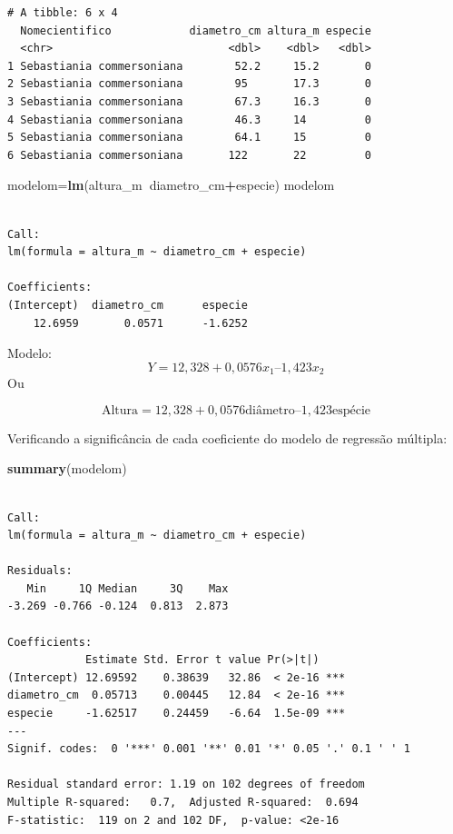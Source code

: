 \documentclass[12pt,brazil,oneside]{book}
\newenvironment{Shaded}{\begin{snugshade}}{\end{snugshade}}
\newcommand{\KeywordTok}[1]{\textcolor[rgb]{0.13,0.29,0.53}{\textbf{#1}}}
\newcommand{\NormalTok}[1]{#1}
\newcommand{\OperatorTok}[1]{\textcolor[rgb]{0.81,0.36,0.00}{\textbf{#1}}}
\begin{document}
\begin{verbatim}
# A tibble: 6 x 4
  Nomecientifico            diametro_cm altura_m especie
  <chr>                           <dbl>    <dbl>   <dbl>
1 Sebastiania commersoniana        52.2     15.2       0
2 Sebastiania commersoniana        95       17.3       0
3 Sebastiania commersoniana        67.3     16.3       0
4 Sebastiania commersoniana        46.3     14         0
5 Sebastiania commersoniana        64.1     15         0
6 Sebastiania commersoniana       122       22         0
\end{verbatim}

\begin{Shaded}
\begin{Highlighting}[]
\NormalTok{modelom=}\KeywordTok{lm}\NormalTok{(altura_m}\OperatorTok{~}\NormalTok{diametro_cm}\OperatorTok{+}\NormalTok{especie) }
\NormalTok{modelom}
\end{Highlighting}
\end{Shaded}

\begin{verbatim}

Call:
lm(formula = altura_m ~ diametro_cm + especie)

Coefficients:
(Intercept)  diametro_cm      especie  
    12.6959       0.0571      -1.6252  
\end{verbatim}

Modelo: \[
Y = 12,328 + 0,0576 x_1 – 1,423 x_2
\] Ou

\[
\text{Altura} = 12,328 + 0,0576\text{diâmetro} – 1,423\text{espécie}
\]

Verificando a significância de cada coeficiente do modelo de regressão
múltipla:

\begin{Shaded}
\begin{Highlighting}[]
\KeywordTok{summary}\NormalTok{(modelom)}
\end{Highlighting}
\end{Shaded}

\begin{verbatim}

Call:
lm(formula = altura_m ~ diametro_cm + especie)

Residuals:
   Min     1Q Median     3Q    Max 
-3.269 -0.766 -0.124  0.813  2.873 

Coefficients:
            Estimate Std. Error t value Pr(>|t|)    
(Intercept) 12.69592    0.38639   32.86  < 2e-16 ***
diametro_cm  0.05713    0.00445   12.84  < 2e-16 ***
especie     -1.62517    0.24459   -6.64  1.5e-09 ***
---
Signif. codes:  0 '***' 0.001 '**' 0.01 '*' 0.05 '.' 0.1 ' ' 1

Residual standard error: 1.19 on 102 degrees of freedom
Multiple R-squared:   0.7,  Adjusted R-squared:  0.694 
F-statistic:  119 on 2 and 102 DF,  p-value: <2e-16
\end{verbatim}
\end{document}
